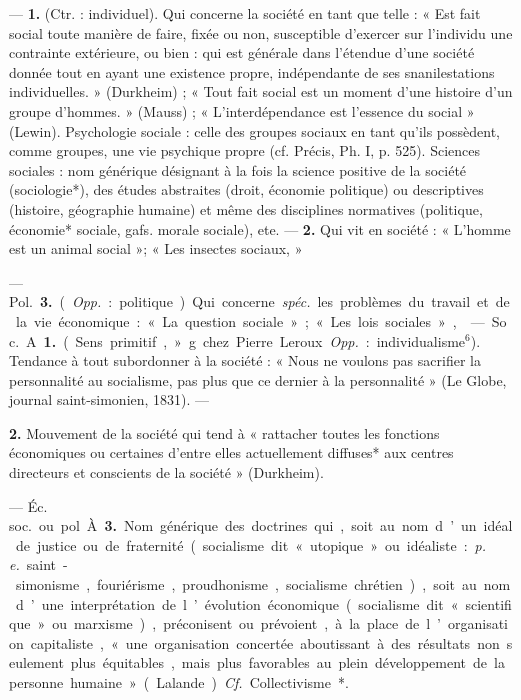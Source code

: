 \begin{itemize}[leftmargin=1cm, label=, itemsep=1pt]
 — {\bf 1.} (Ctr. : individuel). Qui
concerne la société en tant que telle :
« Est fait social toute manière de
faire, fixée ou non, susceptible
d'exercer sur l'individu une contrainte extérieure, ou bien : qui est
générale dans l'étendue d’une société donnée tout en ayant une existence propre, indépendante de ses
snanilestations individuelles. » (Durkheim) ; « Tout fait social est un
moment d’une histoire d’un groupe
d'hommes. » (Mauss) ; « L’interdépendance est l'essence du social »
(Lewin). Psychologie sociale : celle
des groupes sociaux en tant qu'ils
possèdent, comme groupes, une vie
psychique propre (cf. Précis, Ph. I,
p. 525). Sciences sociales : nom
générique désignant à la fois la
science positive de la société (sociologie*), des études abstraites (droit,
économie politique) ou descriptives
(histoire, géographie humaine) et
même des disciplines normatives
(politique, économie* sociale, gafs.
morale sociale), ete. — {\bf 2.} Qui vit
en société : « L'homme est un
animal social »; « Les insectes sociaux, »

— \si{Pol.} {\bf 3.} ({\it Opp.} : politique). Qui
concerne {\it spéc.} les problèmes du travail et de la vie économique : « La
question sociale »; « Les lois sociales »,

 — \si{Soc.} A. {\bf 1.} (Sens primitif, »g. chez Pierre Leroux. {\it Opp.} :
individualisme$^6$). Tendance à tout
subordonner à la société : « Nous ne
voulons pas sacrifier la personnalité
au socialisme, pas plus que ce dernier à la personnalité » (Le Globe,
journal saint-simonien, 1831). —

 {\bf 2.} Mouvement de la société qui tend
à « rattacher toutes les fonctions
économiques ou certaines d’entre
elles actuellement diffuses* aux
centres directeurs et conscients de
la société » (Durkheim).

— \si{Éc. soc.} ou pol. À. {\bf 3.} Nom
générique des doctrines qui, soit au
nom d’un idéal de justice ou de fraternité (socialisme dit « utopique »
ou idéaliste : {\it p. e.} saint-simonisme,
fouriérisme, proudhonisme, socialisme chrétien), soit au nom d’une
interprétation de l’évolution économique (socialisme dit « scientifique »
ou marxisme), préconisent ou prévoient, à la place de l’organisation
capitaliste, « une organisation concertée aboutissant à des résultats
non seulement plus équitables, mais
plus favorables au plein développement de la personne humaine » (Lalande). {\it Cf.} Collectivisme*.


\end{itemize}

